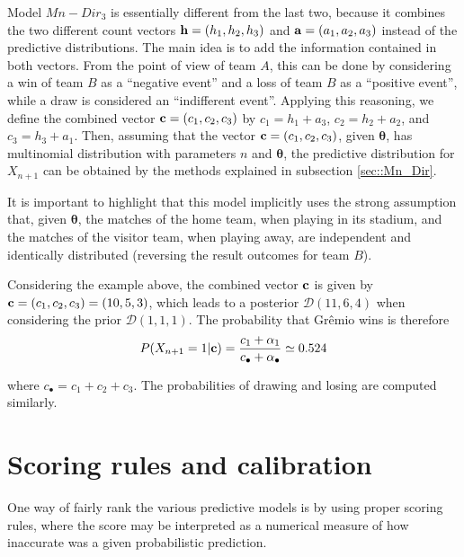 \documentclass[journal,article,accept,moreauthors,pdftex,12pt,a4paper]{mdpi}
\begin{document}
	Model $Mn-Dir_3$ is essentially different from the
	last two, because it combines the two different count vectors ${\bf
		h} = (h_1, h_2, h_3)$ and ${\bf a} = (a_1, a_2, a_3)$ instead of the
	predictive distributions. The main idea is to add the information
	contained in both vectors. From the point of view of team $A$, this can
	be done by considering a win of team $B$ as a ``negative event'' and a
	loss of team $B$ as a ``positive event'', while a draw is
	considered an ``indifferent event''. Applying this reasoning,
	we define the combined vector ${\bf c} = (c_1, c_2, c_3)$ by $c_1 =
	h_1 + a_3$, $c_2 = h_2 + a_2$, and $c_3 = h_3 + a_1$. Then, assuming that the vector ${\bf c} = (c_1, c_2, c_3)$, given $\boldsymbol{\theta}$, has multinomial distribution with parameters $n$ and
	$\boldsymbol{\theta}$, the predictive distribution for $X_{n + 1}$ can
	be obtained by the methods explained in subsection
	\ref{sec::Mn_Dir}.
	
	It is important to highlight that this model implicitly uses the strong assumption that, given $\boldsymbol{\theta}$, the matches of the home team, when playing in its stadium, and the matches of the visitor team, when playing away, are independent and identically distributed (reversing the result outcomes for team $B$).
	
	Considering the example above, the combined vector ${\bf c}$ is given by ${\bf c}=(c_1,c_2,c_3)=(10,5,3)$, which leads to a posterior $\mathcal{D}(11,6,4)$ when considering the prior $\mathcal{D}(1,1,1)$.
	The probability that Gr\^emio wins is therefore	
	\[P(X_{n+1}=1|{\bf c})=\frac{c_1+\alpha_1}{c_{\bullet}+\alpha_{\bullet}}\simeq0.524
	\]
	
	\noindent
	where $c_{\bullet}=c_1+c_2+c_3$. The probabilities of drawing and losing are computed similarly.

	\section{Scoring rules and calibration}
	\label{sec::scoring}
	
	One way of fairly rank the various predictive models is by using proper scoring rules, where
	the score may be interpreted as a numerical measure of how inaccurate was a given probabilistic prediction.
	
\end{document}
